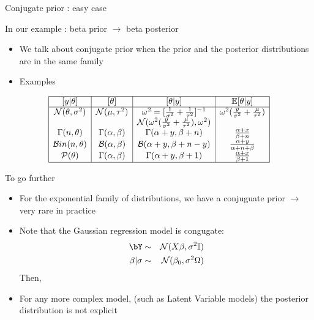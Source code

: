 \begin{frame}{Conjugate prior : easy case}

In our example : beta prior \color{blue}$\rightarrow$ \color{black} beta posterior
\begin{itemize}
\item We talk about conjugate prior when the prior and the posterior distributions are in the same family 
\item \vert Examples \color{black}
\end{itemize}
$$
\begin{array}{|c|c|c|c|} 
\hline
\left[y| \theta\right]  & [\theta]  & [ \theta|y ]& \mathbb{E}[\theta|y]\\
 \hline 
 \mathcal{N}(\theta,\sigma^2)& \mathcal{N}(\mu,\tau^2)& \omega^2 = [\frac{1}{\sigma^2} + \frac{1}{\tau^2}]^{-1} & \omega^{2}(\frac{y}{\sigma^2} + \frac{\mu}{\tau^2})\\
 & &   \mathcal{N}(\omega^{2}(\frac{y}{\sigma^2} + \frac{\mu}{\tau^2}),\omega^2 )&\\
 \Gamma(n,\theta)  & \Gamma(\alpha, \beta) &   \Gamma(\alpha+y, \beta+n)& \frac{\alpha+x}{\beta+n}\\ 
 \mathcal{B}in(n, \theta)&  \mathcal{B}(\alpha,\beta) & \mathcal{B}(\alpha + y, \beta + n - y )&  \frac{\alpha + y}{\alpha + n + \beta}\\
 \mathcal{P}(\theta) &  \Gamma(\alpha, \beta)&  \Gamma(\alpha + y, \beta + 1)&  \frac{\alpha + x}{\beta + 1}\\
 \hline
\end{array}$$
\color{black}

\end{frame}


\begin{frame}{To go further}

\begin{itemize}
\item For the exponential family of distributions, we have  a conjuguate prior \color{blue}$\rightarrow$ \color{black} very rare in practice
\item Note that the Gaussian regression model is congugate: 
\begin{eqnarray*}
 \bY &\sim& \mathcal{N}(X\beta,\sigma^2 \mathbb{I})\\
 \beta  | \sigma &\sim& \mathcal{N}(\beta_0,\sigma^2\Omega)
\end{eqnarray*}
Then, 


\item  For any more complex  model, (such as Latent Variable models)  the posterior distribution is not explicit
\end{itemize}
\end{frame}

